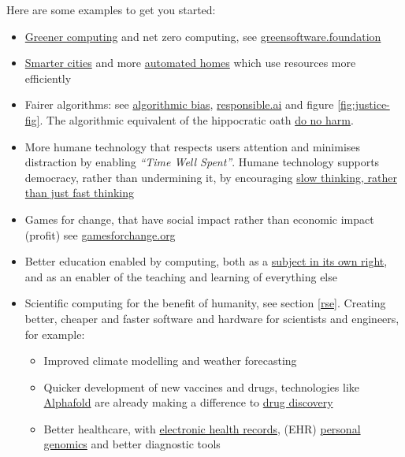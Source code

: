 \documentclass[
]{book}
\providecommand{\tightlist}{%
  \setlength{\itemsep}{0pt}\setlength{\parskip}{0pt}}
\begin{document}
Here are some examples to get you started:

\begin{itemize}
\tightlist
\item
  \href{https://en.wikipedia.org/wiki/Green_computing}{Greener computing} and net zero computing, see \href{https://greensoftware.foundation/}{greensoftware.foundation} \citep{Knowles2022, netzero}
\item
  \href{https://en.wikipedia.org/wiki/Smart_city}{Smarter cities} and more \href{https://en.wikipedia.org/wiki/Home_automation}{automated homes} which use resources more efficiently \citep{smartercities}
\item
  Fairer algorithms: see \href{https://en.wikipedia.org/wiki/Algorithmic_bias}{algorithmic bias}, \href{https://www.responsible.ai/}{responsible.ai} and figure \ref{fig:justice-fig}. The algorithmic equivalent of the hippocratic oath \href{https://en.wikipedia.org/wiki/Primum_non_nocere}{do no harm}.
\item
  More humane technology that respects users attention and minimises distraction by enabling \emph{``Time Well Spent''}. Humane technology supports democracy, rather than undermining it, by encouraging \href{https://en.wikipedia.org/wiki/Thinking,_Fast_and_Slow}{slow thinking, rather than just fast thinking} \citep{Kahneman}
\item
  Games for change, that have social impact rather than economic impact (profit) see \href{https://www.gamesforchange.org/}{gamesforchange.org}
\item
  Better education enabled by computing, both as a \href{https://en.wikipedia.org/wiki/Computer_science_education}{subject in its own right}, and as an enabler of the teaching and learning of everything else
\item
  Scientific computing for the benefit of humanity, see section \ref{rse}. Creating better, cheaper and faster software and hardware for scientists and engineers, for example:

  \begin{itemize}
  \tightlist
  \item
    Improved climate modelling and weather forecasting
  \item
    Quicker development of new vaccines and drugs, technologies like \href{https://en.wikipedia.org/wiki/AlphaFold}{Alphafold} are already making a difference to \href{https://en.wikipedia.org/wiki/Drug_discovery}{drug discovery} \citep{Jumper2021}
  \item
    Better healthcare, with \href{https://en.wikipedia.org/wiki/Electronic_health_record}{electronic health records}, (EHR) \href{https://en.wikipedia.org/wiki/Personal_genomics}{personal genomics} and better diagnostic tools \citep{alphafoldeditorial}
  \end{itemize}
\end{itemize}
\end{document}
